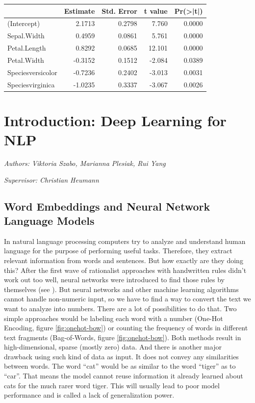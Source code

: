 \documentclass[]{krantz}
\begin{document}
\begin{tabular}{l|r|r|r|r}
\hline
  & Estimate & Std. Error & t value & Pr(>|t|)\\
\hline
(Intercept) & 2.1713 & 0.2798 & 7.760 & 0.0000\\
\hline
Sepal.Width & 0.4959 & 0.0861 & 5.761 & 0.0000\\
\hline
Petal.Length & 0.8292 & 0.0685 & 12.101 & 0.0000\\
\hline
Petal.Width & -0.3152 & 0.1512 & -2.084 & 0.0389\\
\hline
Speciesversicolor & -0.7236 & 0.2402 & -3.013 & 0.0031\\
\hline
Speciesvirginica & -1.0235 & 0.3337 & -3.067 & 0.0026\\
\hline
\end{tabular}

\hypertarget{introduction-deep-learning-for-nlp}{%
\chapter{Introduction: Deep Learning for NLP}\label{introduction-deep-learning-for-nlp}}

\emph{Authors: Viktoria Szabo, Marianna Plesiak, Rui Yang}

\emph{Supervisor: Christian Heumann}

\hypertarget{word-embeddings-and-neural-network-language-models}{%
\section{Word Embeddings and Neural Network Language Models}\label{word-embeddings-and-neural-network-language-models}}

In natural language processing computers try to analyze and understand human language for the purpose of performing useful tasks. Therefore, they extract relevant information from words and sentences. But how exactly are they doing this? After the first wave of rationalist approaches with handwritten rules didn't work out too well, neural networks were introduced to find those rules by themselves (see \citet{Bengio.2003}). But neural networks and other machine learning algorithms cannot handle non-numeric input, so we have to find a way to convert the text we want to analyze into numbers.
There are a lot of possibilities to do that. Two simple approaches would be labeling each word with a number (One-Hot Encoding, figure \ref{fig:onehot-bow}) or counting the frequency of words in different text fragments (Bag-of-Words, figure \ref{fig:onehot-bow}). Both methods result in high-dimensional, sparse (mostly zero) data. And there is another major drawback using such kind of data as input. It does not convey any similarities between words. The word ``cat'' would be as similar to the word ``tiger'' as to ``car''. That means the model cannot reuse information it already learned about cats for the much rarer word tiger. This will usually lead to poor model performance and is called a lack of generalization power.
\end{document}
